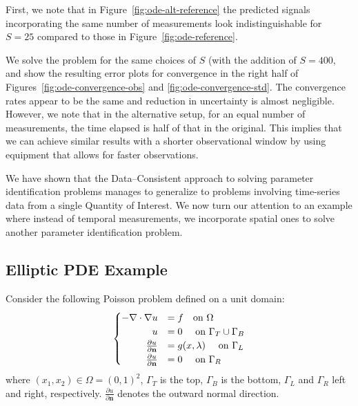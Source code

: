 First, we note that in Figure~\ref{fig:ode-alt-reference} the predicted signals incorporating the same number of measurements look indistinguishable for $S=25$ compared to those in Figure~\ref{fig:ode-reference}.



We solve the problem for the same choices of $S$ (with the addition of $S=400$, and show the resulting error plots for convergence in the right half of Figures~\ref{fig:ode-convergence-obs} and \ref{fig:ode-convergence-std}.
The convergence rates appear to be the same and reduction in uncertainty is almost negligible.
However, we note that in the alternative setup, for an equal number of measurements, the time elapsed is half of that in the original.
This implies that we can achieve similar results with a shorter observational window by using equipment that allows for faster observations.

We have shown that the Data--Consistent approach to solving parameter identification problems manages to generalize to problems involving time-series data from a single Quantity of Interest.
We now turn our attention to an example where instead of temporal measurements, we incorporate spatial ones to solve another parameter identification problem.




\subsection{Elliptic PDE Example}\label{subsec:pde-example}

Consider the following Poisson problem defined on a unit domain:
\begin{equation}\label{eq:pde-equation}
\begin{cases}
\hfill -\nabla \cdot \nabla u &= f \quad\text{on } \Omega \\
\hfill u &= 0 \quad\text{ on } \Gamma_T \cup \Gamma_B \\
\hfill \frac{\partial u}{\partial \mathbf{n}} &= g(x,\param) \quad\text{ on } \Gamma_L \\
\hfill \frac{\partial u}{\partial \mathbf{n}} &= 0 \quad\text{ on } \Gamma_R
\end{cases}
\end{equation}
where $(x_1, x_2) \in \Omega = (0,1)^2$, $\Gamma_T$ is the top, $\Gamma_B$ is the bottom, $\Gamma_L$ and $\Gamma_R$ left and right, respectively.
$\frac{\partial u}{\partial \mathbf{n}}$ denotes the outward normal direction.

